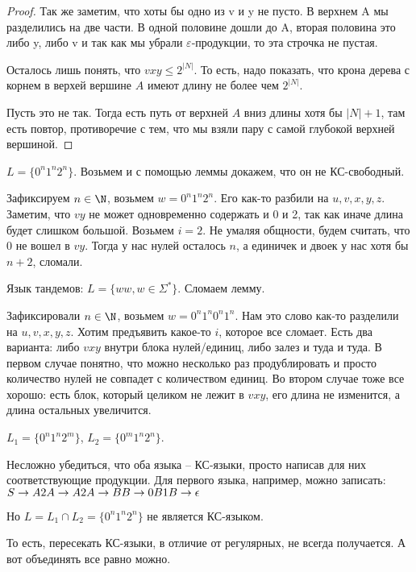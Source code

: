 \begin{proof}
    Так же заметим, что хоты бы одно из v и y не пусто. В верхнем A мы разделились 
    на две части. В одной половине дошли до A, вторая половина это либо y, либо v и
    так как мы убрали $\varepsilon$-продукции, то эта строчка не пустая. 

    Осталось лишь понять, что $vxy \leq 2^{|N|}$. То есть, надо показать, что крона дерева с корнем в верхей вершине $A$ имеют длину не более чем $2^{|N|}$.

    Пусть это не так. Тогда есть путь от верхней $A$ вниз длины хотя бы $|N| + 1$, там есть повтор, противоречие с тем, что мы взяли пару с самой глубокой верхней вершиной.
\end{proof}

\begin{exmp}
$L = \{0^n1^n2^n\}$. Возьмем и с помощью леммы докажем, что он не КС-свободный.

Зафиксируем $n \in \N$, возьмем $w = 0^n1^n2^n$. Его как-то разбили на $u, v, x, y, z$. 
Заметим, что $vy$ не может одновременно содержать и 0 и 2, так как иначе длина будет слишком большой.
Возьмем $i = 2$. Не умаляя общности, будем считать, что 0 не вошел в $vy$. Тогда у нас нулей осталось $n$, а единичек и двоек у нас хотя бы $n + 2$, сломали.
\end{exmp}

\begin{exmp}
Язык тандемов: $L = \{ww, w \in \Sigma^*\}$. Сломаем лемму.

Зафиксировали $n \in \N$, возьмем $w = 0^n1^n0^n1^n$. Нам это слово как-то разделили на $u, v, x, y, z$. 
Хотим предъявить какое-то $i$, которое все сломает. Есть два варианта: либо $vxy$ внутри блока нулей/единиц, либо залез и туда и туда.
В первом случае понятно, что можно несколько раз продублировать и просто количество нулей не совпадет с количеством единиц.
Во втором случае тоже все хорошо: есть блок, который целиком не лежит в $vxy$, его длина не изменится, а длина остальных увеличится.
\end{exmp}
\begin{conseq}
$L_1 = \{0^n1^n2^m\}$, $L_2 = \{0^m1^n2^n\}$.

Несложно убедиться, что оба языка -- КС-языки, просто написав для них соответствующие продукции.
Для первого языка, например, можно записать: $\\
S \to A2\\
A \to A2\\
A \to B\\
B \to 0B1\\
B \to \epsilon$

Но $L = L_1 \cap L_2 = \{0^n1^n2^n\}$ не является КС-языком.

То есть, пересекать КС-языки, в отличие от регулярных, не всегда получается. А вот объединять все равно можно.
\end{conseq}

